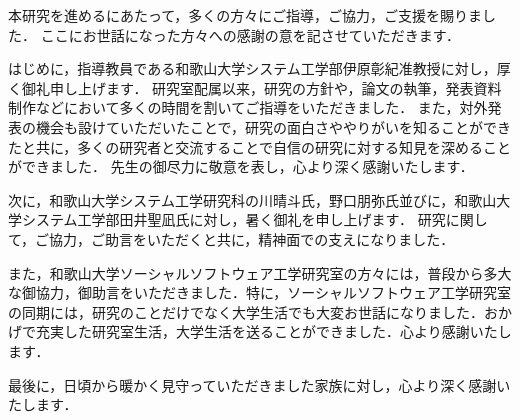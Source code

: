 \documentclass[11pt]{jreport}
\begin{document}
%
%
\begin{acknowledgements}
本研究を進めるにあたって，多くの方々にご指導，ご協力，ご支援を賜りました．
ここにお世話になった方々への感謝の意を記させていただきます．

はじめに，指導教員である和歌山大学システム工学部伊原彰紀准教授に対し，厚く御礼申し上げます．
研究室配属以来，研究の方針や，論文の執筆，発表資料制作などにおいて多くの時間を割いてご指導をいただきました．
また，対外発表の機会も設けていただいたことで，研究の面白さややりがいを知ることができたと共に，多くの研究者と交流することで自信の研究に対する知見を深めることができました．
先生の御尽力に敬意を表し，心より深く感謝いたします．

次に，和歌山大学システム工学研究科の川晴斗氏，野口朋弥氏並びに，和歌山大学システム工学部田井聖凪氏に対し，暑く御礼を申し上げます．
研究に関して，ご協力，ご助言をいただくと共に，精神面での支えになりました．

また，和歌山大学ソーシャルソフトウェア工学研究室の方々には，普段から多大な御協力，御助言をいただきました．特に，ソーシャルソフトウェア工学研究室の同期には，研究のことだけでなく大学生活でも大変お世話になりました．おかげで充実した研究室生活，大学生活を送ることができました．心より感謝いたします．

最後に，日頃から暖かく見守っていただきました家族に対し，心より深く感謝いたします．

\end{acknowledgements}






\appendix

\setcounter{section}{0}
\setcounter{subsection}{0}
\renewcommand{\thesection}{A.\arabic{section}}
\renewcommand{\thesubsection}{\thesection.\arabic{subsection}}
\end{document}
